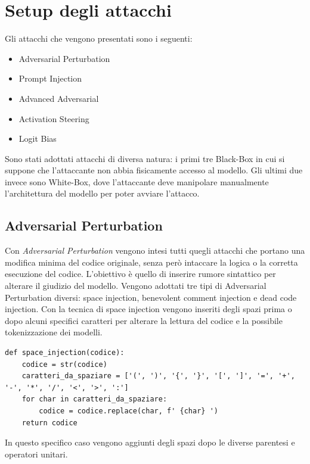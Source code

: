\section{Setup degli attacchi} 
Gli attacchi che vengono presentati sono i seguenti:
\begin{itemize}[noitemsep]
    \item Adversarial Perturbation
    \item Prompt Injection
    \item Advanced Adversarial
    \item Activation Steering
    \item Logit Bias
\end{itemize}

Sono stati adottati attacchi di diversa natura: i primi tre Black-Box in cui si suppone che l'attaccante non abbia fisicamente accesso al modello. Gli ultimi due invece sono White-Box, dove l'attaccante deve manipolare manualmente l'architettura del modello per poter avviare l'attacco.
\subsection{Adversarial Perturbation}
Con \textit{Adversarial Perturbation} vengono intesi tutti quegli attacchi che portano una modifica minima del codice originale, senza però intaccare la logica o la corretta esecuzione del codice.
L'obiettivo è quello di inserire rumore sintattico per alterare il giudizio del modello. Vengono adottati tre tipi di Adversarial Perturbation diversi: space injection, benevolent comment injection e dead code injection.
Con la tecnica di space injection vengono inseriti degli spazi prima o dopo alcuni specifici caratteri per alterare la lettura del codice e la possibile tokenizzazione dei modelli. 
\begin{verbatim}
def space_injection(codice):
    codice = str(codice)
    caratteri_da_spaziare = ['(', ')', '{', '}', '[', ']', '=', '+', '-', '*', '/', '<', '>', ':']
    for char in caratteri_da_spaziare:
        codice = codice.replace(char, f' {char} ')
    return codice
\end{verbatim}

In questo specifico caso vengono aggiunti degli spazi dopo le diverse parentesi e operatori unitari.

